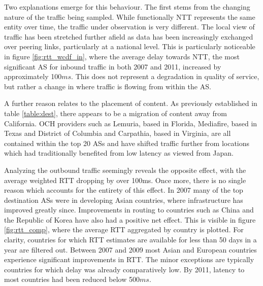 Two explanations emerge for this behaviour. 
The first stems from the changing nature of the traffic being sampled. 
While functionally \acs{NTT} represents the same entity over time, the traffic under observation is very different. 
The local view of traffic has been stretched further afield as data has been increasingly exchanged over peering links, particularly at a national level.
This is particularly noticeable in figure \ref{fig:rtt_wcdf_in}, where the average delay towards \acs{NTT}, the most significant \ac{AS} for inbound traffic in both 2007 and 2011, increased by approximately 100$ms$.
This does not represent a degradation in quality of service, but rather a change in where traffic is flowing from within the \acs{AS}.

A further reason relates to the placement of content. 
As previously established in table \ref{table:dest}, there appears to be a migration of content away from California. 
\ac{OCH} providers such as Lemuria, based in Florida, Mediafire, based in Texas and District of Columbia and Carpathia, based in Virginia, are all contained within the top 20 \acp{AS} and have shifted traffic further from locations which had traditionally benefited from low latency as viewed from Japan.

Analyzing the outbound traffic seemingly reveals the opposite effect, with the average weighted \ac{RTT} dropping by over 100ms. 
Once more, there is no single reason which accounts for the entirety of this effect. 
In 2007 many of the top destination \acp{AS} were in developing Asian countries, where infrastructure has improved greatly since. 
Improvements in routing to countries such as China and the Republic of Korea have also had a positive net effect. 
This is visible in figure \ref{fig:rtt_comp}, where the average \ac{RTT} aggregated by country is plotted. 
For clarity, countries for which RTT estimates are available for less than 50 days in a year are filtered out. 
Between 2007 and 2009 most Asian and European countries experience significant improvements in \ac{RTT}.
The minor exceptions are typically countries for which delay was already comparatively low.
By 2011, latency to most countries had been reduced below 500$ms$.

